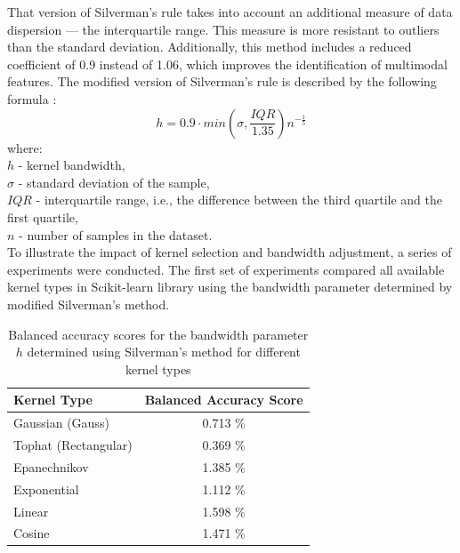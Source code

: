 \documentclass[runningheads]{llncs}
\begin{document}
\noindent That version of Silverman’s rule takes into account an additional measure of data dispersion — the interquartile range. This measure is more resistant to outliers than the standard deviation. Additionally, this method includes a reduced coefficient of 0.9 instead of 1.06, which improves the identification of multimodal features. The modified version of Silverman’s rule is described by the following formula \cite{bandwidth}:
$$h = 0.9\cdot min \left( \sigma, \frac{IQR}{1.35} \right) n^{-\frac{1}{5}}$$ 
where:\\
$h$ -  kernel bandwidth,\\
$\sigma$ - standard deviation of the sample,\\
$IQR$ - interquartile range, i.e., the difference between the third quartile and the first quartile,\\
$n$ - number of samples in the dataset.\\

\noindent To illustrate the impact of kernel selection and bandwidth adjustment, a series of experiments were conducted. The first set of experiments compared all available kernel types in Scikit-learn\cite{scikit-learn} library using the bandwidth parameter determined by modified Silverman’s method. 

\begin{table}[H]

    \centering
        \caption{Balanced accuracy scores for the bandwidth parameter \( h \) determined using Silverman's method for different kernel types}
        \label{tab:KDE1}
        \begin{tabular}{lc}
        \toprule
        \textbf{Kernel Type}        & \multicolumn{1}{l}{\textbf{Balanced Accuracy Score}} \\
        
        \midrule
        Gaussian (Gauss)            & 0.713 \%                                        \\
        Tophat (Rectangular)        & 0.369 \%                                        \\
        Epanechnikov                & 1.385 \%                                        \\
        Exponential                 & 1.112 \%                                        \\
        Linear                      & 1.598 \%                                        \\
        Cosine                      & 1.471 \%  \\ 
        \bottomrule
        \end{tabular}
\end{table}
\end{document}
